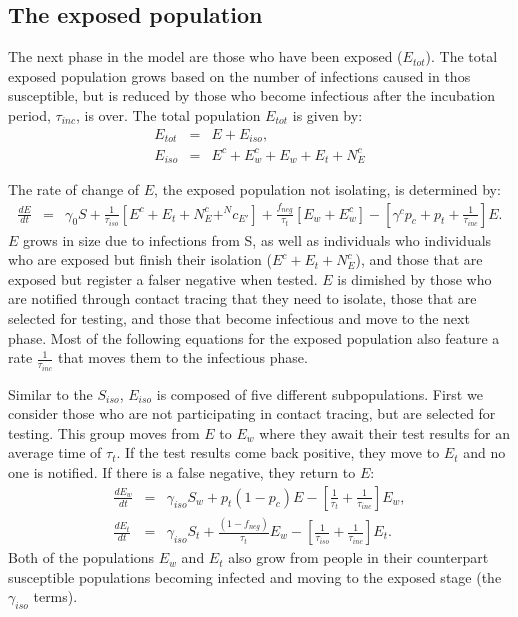 \documentclass[notitlepage, superscriptaddress]{revtex4-2}
\begin{document}
\subsection{The exposed population}
The next phase in the model are those who have been exposed ($E_{tot}$). The total exposed population grows based on the number of infections caused in thos susceptible, but is reduced by those who become infectious after the incubation period, $\tau_{inc}$, is over. The total population $E_{tot}$ is given by:
\begin{eqnarray}
\label{E:Etot}
E_{tot} &=& E + E_{iso}, \\ 
%
E_{iso} &=& E^{c} + E^{c}_{w} + E_{w} + E_{t} + N^{c}_{E}
\end{eqnarray}

The rate of change of $E$, the exposed population not isolating, is determined by:
\begin{eqnarray}
\label{E:dE}
\frac{dE}{dt} &=& \gamma_{0}S  + \frac{1}{\tau_{iso}}[E^{c} + E_{t} + N^{c}_{E} + ^N{c}_{E'}] + \frac{f_{neg}}{\tau_{t}}[E_{w} + E^{c}_{w}] -  [\gamma^{c} p_{c} +p_{t} + \frac{1}{\tau_{inc}}] E.
\end{eqnarray}
$E$ grows in size due to infections from S, as well as individuals who individuals who are exposed but finish their isolation ($E^{c} + E_{t} + N^{c}_{E}$), and those that are exposed but register a falser negative when tested. $E$ is dimished by those who are notified through contact tracing that they need to isolate, those that are selected for testing, and those that become infectious and move to the next phase. Most of the following equations for the exposed population also feature a rate $\frac{1}{\tau_{inc}}$ that moves them to the infectious phase.

Similar to the $S_{iso}$, $E_{iso}$ is composed of five different subpopulations. First we consider those who are not participating in contact tracing, but are selected for testing. This group moves from $E$ to $E_{w}$ where they await their test results for an average time of $\tau_{t}$. If the test results come back positive, they move to $E_{t}$ and no one is notified. If there is a false negative, they return to $E$:
\begin{eqnarray}
\label{E:dE_w}
\frac{dE_{w}}{dt} &=& \gamma_{iso} S_{w} + p_{t} (1 - p_{c}) E - [\frac{1}{\tau_{t}}  + \frac{1}{\tau_{inc}}] E_{w}, \\
%
\frac{dE_{t}}{dt} &=& \gamma_{iso} S_{t} + \frac{(1- f_{neg})}{\tau_{t}} E_{w} - [\frac{1}{\tau_{iso}}  + \frac{1}{\tau_{inc}}] E_{t}.
\end{eqnarray}
Both of the populations $E_{w}$ and $E_{t}$ also grow from people in their counterpart susceptible populations becoming infected and moving to the exposed stage (the $\gamma_{iso}$ terms). 
\end{document}
